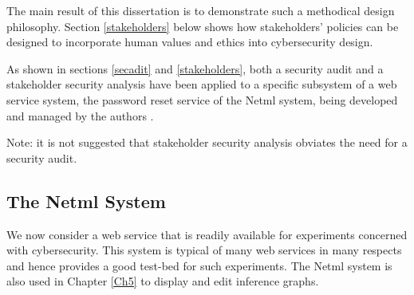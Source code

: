 The main result of this dissertation is to demonstrate such a methodical design philosophy. Section \ref{stakeholders} below shows how stakeholders' policies can be designed
to incorporate human values and ethics into cybersecurity design.

As shown in sections \ref{secadit} and \ref{stakeholders}, both a security audit and a stakeholder security analysis have been applied to a specific subsystem of a web service system, the password reset service of the Netml system, being developed and managed by the authors \cite{sheniar2018experiments}.

Note: it is not suggested that stakeholder security analysis obviates
the need for a security audit.

\subsection{The Netml System}

We now consider a web service that is readily available for experiments concerned with cybersecurity. This system is typical of many web services in many respects and hence provides a good test-bed for such experiments. The Netml system is also used in Chapter \ref{Ch5} to display and edit inference graphs.

